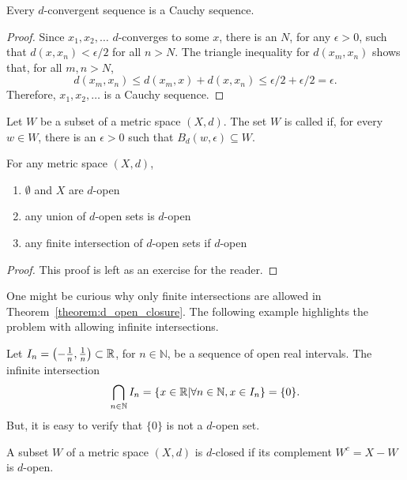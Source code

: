 \begin{theorem}
Every $d$-convergent sequence is a Cauchy sequence.
\end{theorem}
\begin{proof}
Since $x_1,x_2,\ldots$ $d$-converges to some $x$, there is an $N$, for any $\epsilon>0$, such that $d(x,x_n)<\epsilon /2$ for all $n>N$.
The triangle inequality for $d(x_m,x_n)$ shows that, for all $m,n>N$,
\[ d(x_m,x_n)\leq d(x_m,x) + d(x,x_n) \leq \epsilon/2 + \epsilon/2 = \epsilon. \]
Therefore, $x_1,x_2,\ldots$ is a Cauchy sequence.
\end{proof}

\begin{definition}
\label{definition:metspace_dopen}
Let $W$ be a subset of a metric space $(X,d)$.
The set $W$ is called  if, for every $w\in W$, there is an $\epsilon>0$ such that $B_d (w,\epsilon) \subseteq W$.
\end{definition}

\begin{theorem}
\label{theorem:d_open_closure}
For any metric space $(X,d)$,
\begin{enumerate}
\item $\emptyset$ and $X$ are $d$-open
\item any union of $d$-open sets is $d$-open
\item any finite intersection of $d$-open sets if $d$-open
\end{enumerate}
\end{theorem}
\begin{proof}
This proof is left as an exercise for the reader.
\end{proof}

One might be curious why only finite intersections are allowed in Theorem~\ref{theorem:d_open_closure}.
The following example highlights the problem with allowing infinite intersections.
\begin{example}
Let $I_n = \left(-\frac{1}{n},\frac{1}{n} \right) \subset \mathbb{R}$, for $n\in \mathbb{N}$, be a sequence of open real intervals.
The infinite intersection
\[ \bigcap_{n\in \mathbb{N}} I_n = \{ x\in \mathbb{R} | \forall n\in \mathbb{N}, x\in I_n \} = \{0 \}. \]
But, it is easy to verify that $\{ 0 \}$ is not a $d$-open set.
\end{example}

\begin{definition}
A subset $W$ of a metric space $(X,d)$ is $d$-closed if its complement $W^c = X-W$ is $d$-open.
\end{definition}

